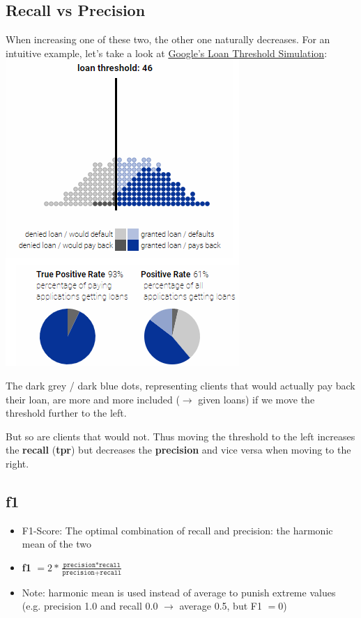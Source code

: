 \documentclass[12pt,a4paper]{article}
\begin{document}
\subsection*{Recall vs Precision}
When increasing one of these two, the other one naturally decreases. For an intuitive example, let's take a look at \href{https://research.google.com/bigpicture/attacking-discrimination-in-ml/}{Google's Loan Threshold Simulation}:\\
\includegraphics[scale=0.7]{resources/3/loanML3}\\
\begin{description}
\item The dark grey / dark blue dots, representing clients that would actually pay back their loan, are more and more included ($\rightarrow$ given loans) if we move the threshold further to the left.
\item But so are clients that would not. Thus moving the threshold to the left increases the \textbf{recall} (\textbf{tpr}) but decreases the \textbf{precision} and vice versa when moving to the right.
\end{description}
\subsection{f1}
\begin{itemize}
\item F1-Score: The optimal combination of recall and precision: the harmonic mean of the two
\item \textbf{f1} $=2*\frac{\texttt{precision} * \texttt{recall}}{\texttt{precision}+\texttt{recall}}$
\item Note: harmonic mean is used instead of average to punish extreme values (e.g. precision 1.0 and recall 0.0 $\rightarrow$ average 0.5, but F1 $= 0$)
\end{itemize}
\end{document}
